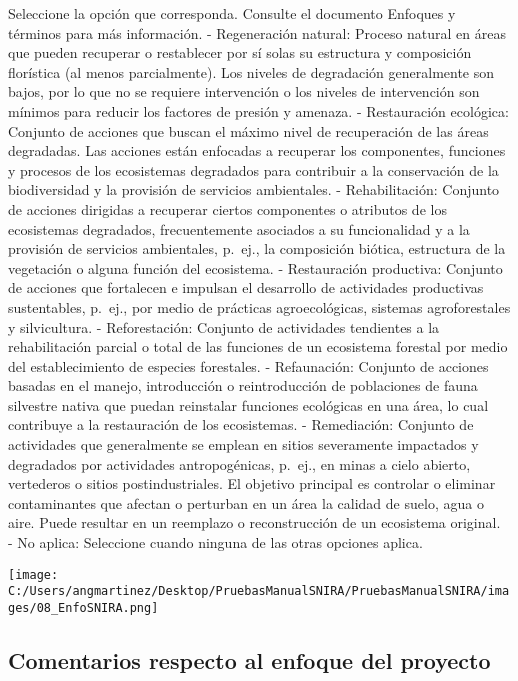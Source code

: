\documentclass[
]{book}
\begin{document}
Seleccione la opción que corresponda.
Consulte el documento Enfoques y términos para más información.
- Regeneración natural: Proceso natural en áreas que pueden recuperar o restablecer por sí solas su estructura y composición florística (al menos parcialmente).
Los niveles de degradación generalmente son bajos, por lo que no se requiere intervención o los niveles de intervención son mínimos para reducir los factores de presión y amenaza.
- Restauración ecológica: Conjunto de acciones que buscan el máximo nivel de recuperación de las áreas degradadas.
Las acciones están enfocadas a recuperar los componentes, funciones y procesos de los ecosistemas degradados para contribuir a la conservación de la biodiversidad y la provisión de servicios ambientales.
- Rehabilitación: Conjunto de acciones dirigidas a recuperar ciertos componentes o atributos de los ecosistemas degradados, frecuentemente asociados a su funcionalidad y a la provisión de servicios ambientales, p.~ej., la composición biótica, estructura de la vegetación o alguna función del ecosistema.
- Restauración productiva: Conjunto de acciones que fortalecen e impulsan el desarrollo de actividades productivas sustentables, p.~ej., por medio de prácticas agroecológicas, sistemas agroforestales y silvicultura.
- Reforestación: Conjunto de actividades tendientes a la rehabilitación parcial o total de las funciones de un ecosistema forestal por medio del establecimiento de especies forestales.
- Refaunación: Conjunto de acciones basadas en el manejo, introducción o reintroducción de poblaciones de fauna silvestre nativa que puedan reinstalar funciones ecológicas en una área, lo cual contribuye a la restauración de los ecosistemas.
- Remediación: Conjunto de actividades que generalmente se emplean en sitios severamente impactados y degradados por actividades antropogénicas, p.~ej., en minas a cielo abierto, vertederos o sitios postindustriales.
El objetivo principal es controlar o eliminar contaminantes que afectan o perturban en un área la calidad de suelo, agua o aire.
Puede resultar en un reemplazo o reconstrucción de un ecosistema original.\\
- No aplica: Seleccione cuando ninguna de las otras opciones aplica.

\texttt{[image: C:/Users/angmartinez/Desktop/PruebasManualSNIRA/PruebasManualSNIRA/images/08\_EnfoSNIRA.png]}

\hypertarget{comentarios-respecto-al-enfoque-del-proyecto}{%
\subsection{Comentarios respecto al enfoque del proyecto}\label{comentarios-respecto-al-enfoque-del-proyecto}}
\end{document}
